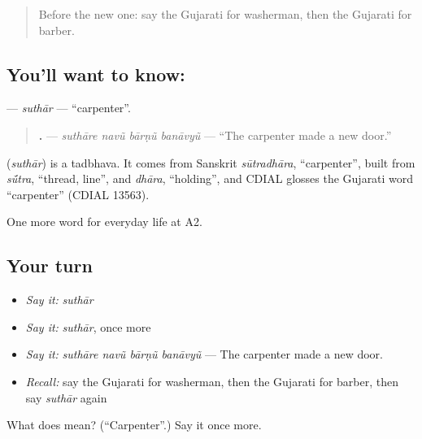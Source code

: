 \label{lesson:GU-C201-suthar}



\begin{quote}
Before the new one: say the Gujarati for washerman, then the Gujarati for barber.
\end{quote}

\subsection*{You'll want to know: }
\textbf{} — \emph{suthār} — \textquotedblleft{}carpenter\textquotedblright{}.

\begin{quote}
\textbf{   .} — \emph{suthāre navũ bārṇũ banāvyũ} — \textquotedblleft{}The carpenter made a new door.\textquotedblright{}
\end{quote}

\begin{cousinweb}
\textbf{} (\emph{suthār}) is a tadbhava. It comes from Sanskrit \emph{sūtradhāra}, \textquotedblleft{}carpenter\textquotedblright{}, built from \emph{sū́tra}, \textquotedblleft{}thread, line\textquotedblright{}, and \emph{dhāra}, \textquotedblleft{}holding\textquotedblright{}, and CDIAL glosses the Gujarati word \textquotedblleft{}carpenter\textquotedblright{} (CDIAL 13563).
\end{cousinweb}

\begin{grammarlens}[title={What you've built}]
One more word for everyday life at A2.
\end{grammarlens}

\subsection*{Your turn}
\begin{itemize}
\raggedright
  \item \emph{Say it:} \emph{suthār}
  \item \emph{Say it:} \emph{suthār}, once more
  \item \emph{Say it:} \emph{suthāre navũ bārṇũ banāvyũ} — The carpenter made a new door.
  \item \emph{Recall:} say the Gujarati for washerman, then the Gujarati for barber, then say \emph{suthār} again
\end{itemize}

\begin{tcolorbox}[breakable,colback=teal!4,colframe=teal!35!black,title={Before you move on}]
What does  mean? (\textquotedblleft{}Carpenter\textquotedblright{}.) Say it once more.
\end{tcolorbox}
